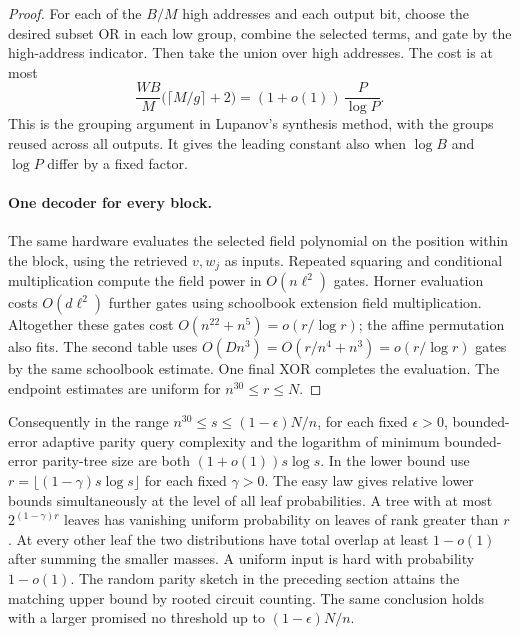 \begin{proof}
For each of the $B/M$ high addresses and each output bit, choose the desired subset OR in each low group, combine the selected terms, and gate by the high-address indicator. Then take the union over high addresses. The cost is at most
\[
           \frac{WB}{M}\bigl(\lceil M/g\rceil+2\bigr)
                      =(1+o(1))\,\frac P{\log P}.
\]
This is the grouping argument in Lupanov's synthesis method, with the groups reused across all outputs. It gives the leading constant also when $\log B$ and $\log P$ differ by a fixed factor.

\paragraph{One decoder for every block.}
The same hardware evaluates the selected field polynomial on the position within the block, using the retrieved $v,w_j$ as inputs. Repeated squaring and conditional multiplication compute the field power in $O(n\ell^2)$ gates. Horner evaluation costs $O(d\ell^2)$ further gates using schoolbook extension field multiplication. Altogether these gates cost $O(n^{22}+n^5)=o(r/\log r)$; the affine permutation also fits. The second table uses $O(Dn^3)=O(r/n^4+n^3)=o(r/\log r)$ gates by the same schoolbook estimate. One final XOR completes the evaluation. The endpoint estimates are uniform for $n^{30}\le r\le N$.
\end{proof}

Consequently in the range $n^{30}\le s\le(1-\epsilon)N/n$, for each fixed $\epsilon>0$, bounded-error adaptive parity query complexity and the logarithm of minimum bounded-error parity-tree size are both $(1+o(1))s\log s$. In the lower bound use $r=\lfloor (1-\gamma)s\log s\rfloor$ for each fixed $\gamma>0$. The easy law gives relative lower bounds simultaneously at the level of all leaf probabilities. A tree with at most $2^{(1-\gamma)r}$ leaves has vanishing uniform probability on leaves of rank greater than $r$. At every other leaf the two distributions have total overlap at least $1-o(1)$ after summing the smaller masses. A uniform input is hard with probability $1-o(1)$. The random parity sketch in the preceding section attains the matching upper bound by rooted circuit counting. The same conclusion holds with a larger promised no threshold up to $(1-\epsilon)N/n$.

